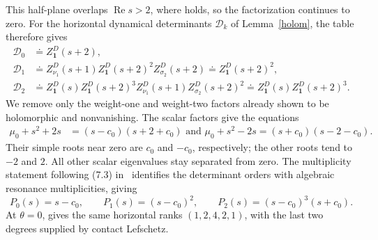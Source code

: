 \documentclass[11pt,letterpaper,reqno]{amsart}
\theoremstyle{remark}
\begin{document}
This half-plane overlaps $\operatorname{Re}s>2$, where
\cite[(7.6)]{DGRS} holds, so the factorization continues to zero.
For the horizontal dynamical determinants $\mathscr D_k$
of Lemma~\ref{holom}, the table therefore gives
\[
 \begin{aligned}
 \mathscr D_0&\doteq Z^D_{\mathbf1}(s+2),\\
 \mathscr D_1&\doteq
 Z^D_{\nu_1}(s+1)Z^D_{\mathbf1}(s+2)^2Z^D_{\sigma_2}(s+2)
 \doteq Z^D_{\mathbf1}(s+2)^2,\\
 \mathscr D_2&\doteq
 Z^D_{\mathbf1}(s)Z^D_{\mathbf1}(s+2)^3
 Z^D_{\nu_1}(s+1)Z^D_{\sigma_2}(s+2)^2\doteq Z^D_{\mathbf1}(s)Z^D_{\mathbf1}(s+2)^3.
 \end{aligned}
\]
We remove only the weight-one and weight-two factors already shown
to be holomorphic and nonvanishing. The scalar factors give the equations
\[
 \begin{aligned}
 \mu_0+s^2+2s&=(s-c_0)(s+2+c_0)\text{ and }
 \mu_0+s^2-2s=(s+c_0)(s-2-c_0).
 \end{aligned}
\]
Their simple roots near zero are $c_0$ and $-c_0$, respectively;
the other roots tend to $-2$ and $2$.
All other scalar eigenvalues stay separated from zero.
The multiplicity statement following (7.3) in~\cite{DGRS} identifies
the determinant orders with algebraic resonance multiplicities, giving
\begin{equation}\label{app:clusterpolynomials}
 P_0(s)=s-c_0,\qquad P_1(s)=(s-c_0)^2,\qquad
 P_2(s)=(s-c_0)^3(s+c_0).
\end{equation}
At $\theta=0$, \cite[Proposition~7.7]{DGRS} gives the same horizontal
ranks $(1,2,4,2,1)$, with the last two degrees supplied by contact
Lefschetz.
\end{document}
